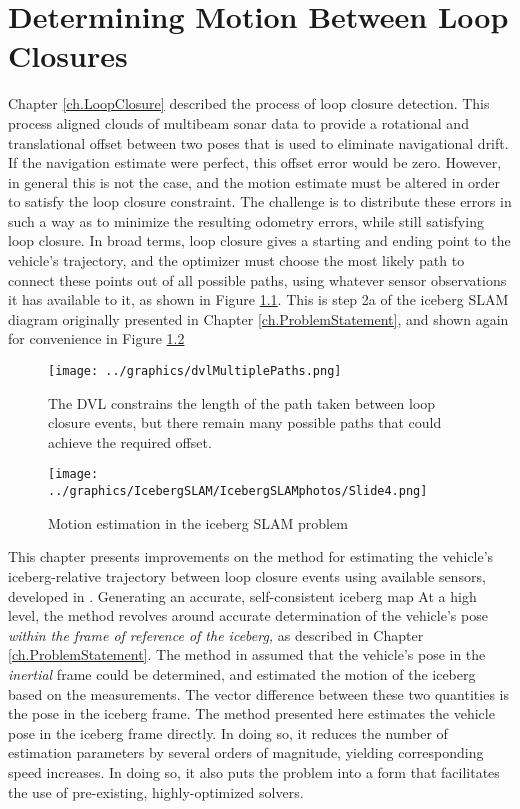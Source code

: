 
\chapter{Determining Motion Between Loop Closures}
\label{ch.IcebergGeometry}

Chapter \ref{ch.LoopClosure} described the process of loop closure detection. This process aligned clouds of multibeam sonar data to provide a rotational and translational offset between two poses that is used to eliminate navigational drift. If the navigation estimate were perfect, this offset error would be zero. However, in general this is not the case, and the motion estimate must be altered in order to satisfy the loop closure constraint. The challenge is to distribute these errors in such a way as to minimize the resulting odometry errors, while still satisfying loop closure. In broad terms, loop closure gives a starting and ending point to the vehicle's trajectory, and the optimizer must choose the most likely path to connect these points out of all possible paths, using whatever sensor observations it has available to it, as shown in Figure \ref{fig:MultiPath}. This is step 2a of the iceberg SLAM diagram originally presented in Chapter \ref{ch.ProblemStatement}, and shown again for convenience in Figure \ref{fig:icebergSLAMmotion}

\begin{figure}[htbp]
   \centering
   \texttt{[image: ../graphics/dvlMultiplePaths.png]} %
   \caption{The DVL constrains the length of the path taken between loop closure events, but there remain many possible paths that could achieve the required offset.}
   \label{fig:MultiPath}
\end{figure}

\begin{figure}[htb]
   \centering
   \texttt{[image: ../graphics/IcebergSLAM/IcebergSLAMphotos/Slide4.png]} %
   \caption{Motion estimation in the iceberg SLAM problem}
   \label{fig:icebergSLAMmotion}
\end{figure}

This chapter presents improvements on the method for estimating the vehicle's iceberg-relative trajectory between loop closure events using available sensors, developed in \cite{Kimball2011b}. Generating an accurate, self-consistent iceberg map  At a high level, the method revolves around accurate determination of the vehicle's pose \emph{within the frame of reference of the iceberg,} as described in Chapter \ref{ch.ProblemStatement}. The method in \cite{Kimball2011b} assumed that the vehicle's pose in the \emph{inertial} frame could be determined, and estimated the motion of the iceberg based on the measurements. The vector difference between these two quantities is the pose in the iceberg frame. The method presented here estimates the vehicle pose in the iceberg frame directly. In doing so, it reduces the number of estimation parameters by several orders of magnitude, yielding corresponding speed increases. In doing so, it also puts the problem into a form that facilitates the use of pre-existing, highly-optimized solvers.

